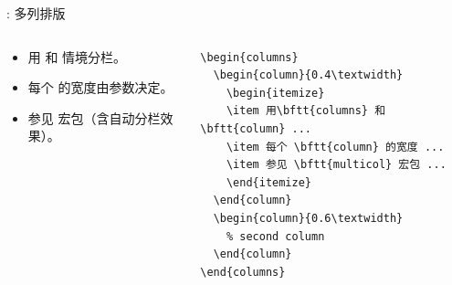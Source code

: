 \documentclass{beamer}
\begin{document}
\begin{frame}[fragile]{\insertsection: 多列排版}
\begin{columns}
\begin{column}{0.4\textwidth}
\begin{itemize}
\item 用 和  情境分栏。
\item 每个  的宽度由参数决定。
\item 参见  宏包（含自动分栏效果）。
\end{itemize}
\end{column}
\begin{column}{0.6\textwidth}
\begin{verbatim}
\begin{columns}
  \begin{column}{0.4\textwidth}
    \begin{itemize}
    \item 用\bftt{columns} 和 \bftt{column} ...
    \item 每个 \bftt{column} 的宽度 ...
    \item 参见 \bftt{multicol} 宏包 ...
    \end{itemize}
  \end{column}
  \begin{column}{0.6\textwidth}
    % second column
  \end{column}
\end{columns}
\end{verbatim}
\end{column}
\end{columns}
\end{frame}
\end{document}
